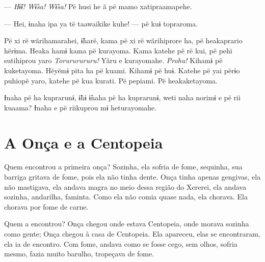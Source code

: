 --- \textit{Hɨ̃ɨ! Wɨ̃sa! Wɨ̃sa! }Pë husi he ã pë mamo xatipraamapehe. 

--- Hei, ɨnaha ipa ya të taawaikike kuhe! --- pë kuɨ topraroma. 


Pë xi rë wãrihamarahei, ɨ̃harë, kama pë xi rë wãrihiprore ha, pë
heakaprario hërɨma. Heaka hamɨ kama pë kurayoma. Kama katehe pë rë kui,
pë pehi sutihiprou yaro \textit{Torururururu!} Yãru e kurayomahe. \textit{Prohu!} Kihamɨ
pë kuketayoma. Hëyëmɨ pita ha pë kuami. Kihamɨ pë huɨ. Katehe pë yai
përɨo puhiopë yaro, katehe pë kua kurati. Pë pepiami. Pë heakaketayoma. 

Ɨnaha pë ha kuprarunɨ, ɨ̃hɨ ɨ̃naha pë ha kuprarunɨ, weti naha norimɨ e pë
rii kuaama? Ɨnaha e pë riikuprou mɨ heturayomahe. 

 
\chapter{A Onça e a Centopeia}
 
  

Quem encontrou a primeira onça? Sozinha, ela sofria de fome, sequinha,
sua barriga gritava de fome, pois ela não tinha dente. Onça tinha apenas
gengivas, ela não mastigava, ela andava magra no meio dessa região do
Xererei, ela andava sozinha, andarilha, faminta. Como ela não comia quase
nada, ela chorava. Ela chorava por fome de carne. 

Quem a encontrou? Onça chegou onde estava Centopeia, onde morava
sozinha como gente; Onça chegou à casa de Centopeia. Ela apareceu, elas
se encontraram, ela ia de encontro. Com fome, andava como se fosse cego,
sem olhos, sofria mesmo, fazia muito barulho, tropeçava de fome. 

